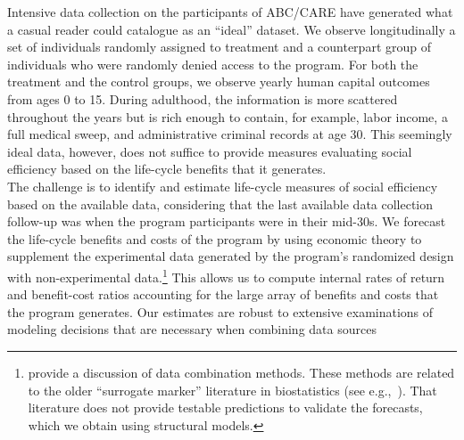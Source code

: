 \noindent Intensive data collection on the participants of ABC/CARE have generated what a casual reader could catalogue as an ``ideal'' dataset. We observe longitudinally a set of individuals randomly assigned to treatment and a counterpart group of individuals who were randomly denied access to the program. For both the treatment and the control groups, we observe yearly human capital outcomes from ages 0 to 15. During adulthood, the information is more scattered throughout the years but is rich enough to contain, for example, labor income, a full medical sweep, and administrative criminal records at age 30. This seemingly ideal data, however, does not suffice to provide measures evaluating social efficiency based on the life-cycle benefits that it generates.\\

\noindent The challenge is to identify and estimate life-cycle measures of social efficiency based on the available data, considering that the last available data collection follow-up was when the program participants were in their mid-30s. We forecast the life-cycle benefits and costs of the program by using economic theory to supplement the experimental data generated by the program's randomized design with non-experimental data.\footnote{\citet{Ridder_Moffitt_2007_hbk_metricsdata} provide a discussion of data combination methods. These methods are related to the older ``surrogate marker'' literature in biostatistics (see e.g.,\ \citealp{Prentice_1989_Surrogate_SiM}). That literature does not provide testable predictions to validate the forecasts, which we obtain using structural models.} This allows us to compute internal rates of return and benefit-cost ratios accounting for the large array of benefits and costs that the program generates. Our estimates are robust to extensive examinations of modeling decisions that are necessary when combining data sources\\

